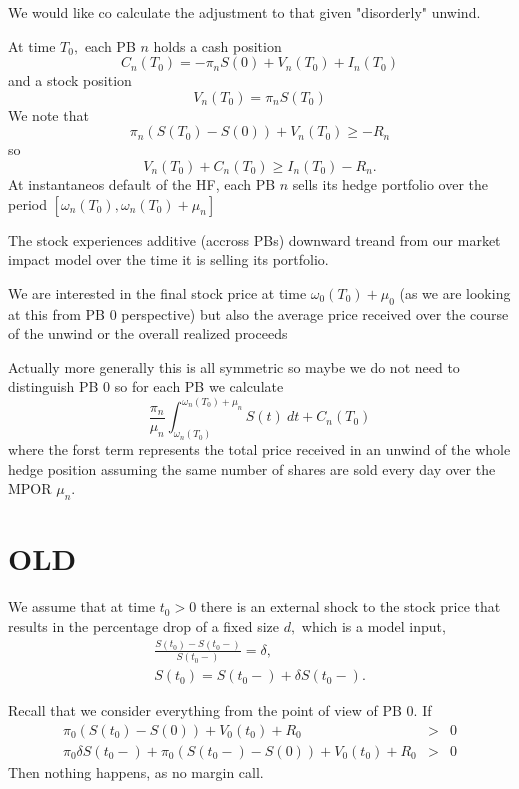 \documentclass{article}
\begin{document}
We would like co calculate the adjustment to that given "disorderly" unwind.

At time $T_{0},$ each PB $n$ holds a cash position%
\[
C_{n}(T_{0})=-\pi _{n}S(0)+V_{n}(T_{0})+I_{n}(T_{0})
\]%
and a stock position%
\[
V_{n}(T_{0})=\pi _{n}S(T_{0})
\]%
We note that 
\[
\pi _{n}\left( S(T_{0})-S(0)\right) +V_{n}(T_{0})\geq -R_{n}
\]%
so%
\[
V_{n}(T_{0})+C_{n}(T_{0})\geq I_{n}(T_{0})-R_{n}.
\]%
At instantaneos default of the HF, each PB $n$ sells its hedge portfolio
over the period $[\omega _{n}(T_{0}),\omega _{n}(T_{0})+\mu _{n}]$

The stock experiences additive (accross PBs) downward treand from our market
impact model over the time it is selling its portfolio.

We are interested in the final stock price at time $\omega _{0}(T_{0})+\mu
_{0}$ (as we are looking at this from PB $0$ perspective) but also the
average price received over the course of the unwind or the overall realized
proceeds

Actually more generally this is all symmetric so maybe we do not need to
distinguish PB $0$ so for each PB we calculate%
\[
\frac{\pi _{n}}{\mu _{n}}\int_{\omega _{n}(T_{0})}^{\omega _{n}(T_{0})+\mu
_{n}}S(t)~dt+C_{n}(T_{0})
\]%
where the forst term represents the total price received in an unwind of the
whole hedge position assuming the same number of shares are sold every day
over the MPOR $\mu _{n}$.

\section{OLD}

We assume that at time $t_{0}>0$ there is an external shock to the stock
price that results in the percentage drop of a fixed size $d,$ which is a
model input,%
\begin{gather*}
\frac{S(t_{0})-S(t_{0}-)}{S(t_{0}-)}=\delta , \\
S(t_{0})=S(t_{0}-)+\delta S(t_{0}-).
\end{gather*}

Recall that we consider everything from the point of view of PB $0.$ If 
\begin{eqnarray*}
\pi _{0}\left( S(t_{0})-S(0)\right) +V_{0}(t_{0})+R_{0} &>&0 \\
\pi _{0}\delta S(t_{0}-)+\pi _{0}\left( S(t_{0}-)-S(0)\right)
+V_{0}(t_{0})+R_{0} &>&0
\end{eqnarray*}%
Then nothing happens, as no margin call.
\end{document}

